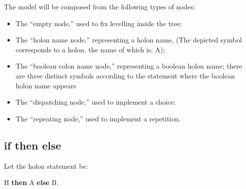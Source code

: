 \documentclass[openany,nobib]{tufte-book}
\newcommand{\kw}[1]{{\bf #1}}
\begin{document}
The model will be composed from the following types of nodes:
\begin{marginfigure}[5.05cm]
\end{marginfigure}
\begin{itemize}
    \item[a] The ``empty node,'' used to fix levelling inside the tree;
    \item[b] The ``holon name node,'' representing a holon name, (The depicted
symbol corresponds to a holon, the name of which is: \textsf{A});
    \item[c] The ``boolean colon name node,'' representing a boolean holon
name; there are three distinct symbols according to the statement where the
boolean holon name appears
    \setlength\itemsep{1.8em}
    \item[d] The ``dispatching node,'' used to implement a choice;
    \setlength\itemsep{.8em}
    \item[e] The ``repeating node,'' used to implement a repetition.
\end{itemize}

\bigskip
\subsection{if then else}

\medskip
\noindent Let the holon statement be:

\medskip

\noindent\-\hspace{0.7cm}\kw{if} H \kw{then} A \kw{else} B.
\end{document}
